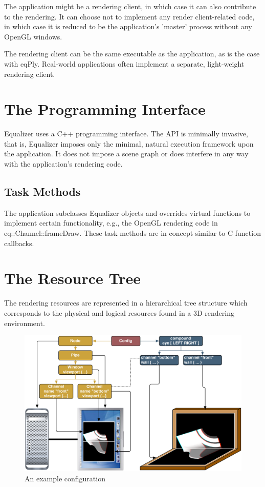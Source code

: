 \documentclass[10pt,a4]{scrartcl}
\begin{document}
The application might be a rendering client, in which case it can also
contribute to the rendering. It can choose not to implement any render
client-related code, in which case it is reduced to be the application's
'master' process without any OpenGL windows.

The rendering client can be the same executable as the application, as
is the case with \textsf{eqPly}. Real-world applications often implement
a separate, light-weight rendering client.

\section{The Programming Interface}

Equalizer uses a C++ programming interface. The API is minimally
invasive, that is, Equalizer imposes only the minimal, natural execution
framework upon the application. It does not impose a scene graph or does
interfere in any way with the application's rendering code.

\subsection{\label{ssTaskMethods}Task Methods}

The application subclasses Equalizer objects and overrides virtual
functions to implement certain functionality, e.g., the OpenGL rendering
code in \textsf{eq::Channel::frameDraw}. These task methods are in
concept similar to C function callbacks.

\section{The Resource Tree}

The rendering resources are represented in a hierarchical tree structure
which corresponds to the physical and logical resources found in a 3D
rendering environment. 

\begin{figure}[ht]
  \centering
  \includegraphics[width=\columnwidth]{desk.pdf}{\caption{\label{fConfig}An
      example configuration}}
\end{figure}
\end{document}
